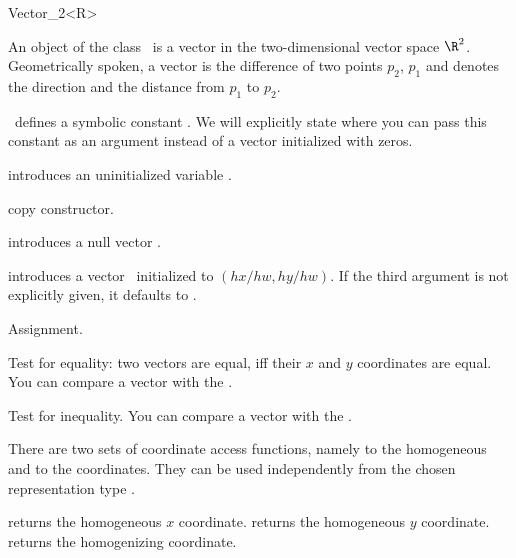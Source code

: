 \begin{ccRefClass} {Vector_2<R>}

\ccDefinition

An object of the class \ccRefName\ is a vector in the two-dimensional 
vector space $\R^2$. Geometrically spoken, a vector is the difference
of two points $p_2$, $p_1$ and denotes the direction and the distance
from   $p_1$ to $p_2$. 

\cgal\ defines a symbolic constant . We 
will explicitly state where you can pass this constant as an argument
instead of a vector initialized with zeros.


\ccCreation
{}


\ccHidden{}
             {introduces an uninitialized variable \ccVar.}

\ccHidden {}
 	    {copy constructor.}

 	    {introduces a null vector \ccVar.}

            {introduces a vector \ccVar\ initialized to $(hx/hw,hy/hw)$.
             If the third argument is not explicitly given, it defaults
             to .
             \ccPrecond {} }


\ccOperations

\ccHidden {}
        {Assignment.}

       {Test for equality: two vectors are equal, iff their $x$ and $y$ 
        coordinates are equal. You can compare a vector with the
        .}

       {Test for inequality. You can compare a vector with the
        .}


There are two sets of coordinate access functions, namely to the
homogeneous and to the  coordinates. They can be used
independently from the chosen representation type .

       {returns the homogeneous $x$ coordinate.}
\ccGlue
{}
       {returns the homogeneous $y$ coordinate.}
\ccGlue
{}
       {returns the homogenizing  coordinate.}


\end{ccRefClass}
